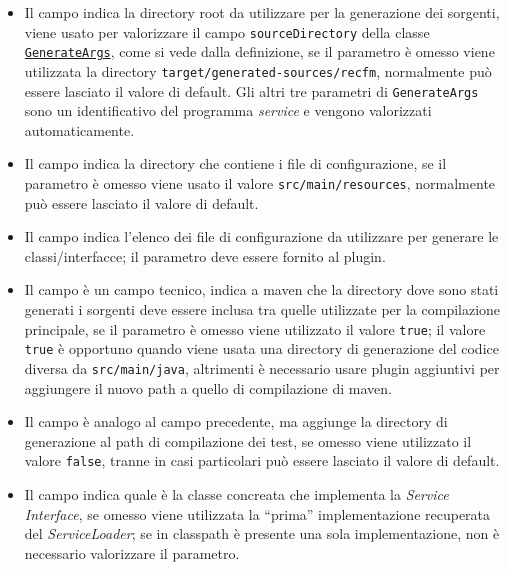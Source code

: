\documentclass[a4paper,10pt]{report}
\begin{document}
\begin{itemize}
\item {}
	Il campo  indica la 
	directory root da utilizzare per la generazione dei sorgenti, viene usato 
	per valorizzare il campo \verb!sourceDirectory! della classe 
	\hyperref[lst:GenerateArgs]{\texttt{GenerateArgs}}, come si vede dalla 
	definizione, se il parametro è omesso viene utilizzata la directory 
	\verb!target/generated-sources/recfm!, 	normalmente può essere lasciato il 
	valore di default.
	Gli altri tre parametri di \texttt{GenerateArgs} sono un identificativo del
	programma \textsl{service} e vengono valorizzati automaticamente.
\item {}
	Il campo  indica la 
	directory che contiene i file	di configurazione, se il parametro è omesso 
	viene usato il valore \verb!src/main/resources!, normalmente può essere 
	lasciato il valore di default.
\item {}
	Il campo  indica l'elenco dei 
	file di configurazione da utilizzare per generare le classi/interfacce; il 
	parametro deve essere fornito al plugin.
\item {}
	Il campo  è un 
	campo tecnico, indica a maven che la directory dove sono stati generati i 
	sorgenti deve essere inclusa tra quelle utilizzate per la compilazione 
	principale, se il parametro è omesso viene utilizzato il valore 
	\verb!true!; il valore \verb!true! è opportuno quando viene usata una 
	directory di generazione del codice diversa da \verb!src/main/java!, 
	altrimenti è necessario usare plugin aggiuntivi per aggiungere il nuovo path 
	a quello di compilazione di maven.
\item {}
	Il campo  è 
	analogo al campo precedente, ma aggiunge la directory di generazione al path 
	di compilazione dei test, se omesso viene utilizzato il valore \verb!false!, 
	tranne in casi particolari può essere lasciato il valore di default.
\item {}
	Il campo  indica 
	quale è la classe concreata che implementa la \textsl{Service Interface}, se 
	omesso viene utilizzata la ``prima'' implementazione recuperata del 
	\textsl{ServiceLoader}; se in classpath è presente una sola implementazione, 
	non è necessario valorizzare il parametro. 
\end{itemize}
\end{document}
